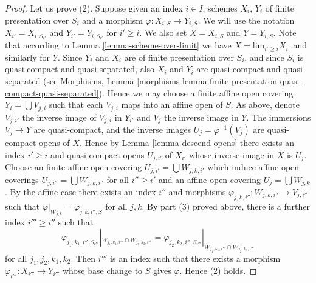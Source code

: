 \begin{proof}
\medskip\noindent
Let us prove (2). Suppose given an index $i \in I$, schemes
$X_i$, $Y_i$ of finite presentation over $S_i$ and a morphism
$\varphi : X_{i,S} \to Y_{i, S}$. We will use the notation
$X_{i'} = X_{i, S_{i'}}$ and $Y_{i'} = Y_{i, S_{i'}}$ for
$i' \geq i$. We also set $X = X_{i, S}$ and $Y = Y_{i, S}$.
Note that according to Lemma \ref{lemma-scheme-over-limit} we have
$X = \text{lim}_{i' \geq i} X_{i'}$ and similarly for $Y$.
Since $Y_i$ and $X_i$ are of finite presentation
over $S_i$, and since $S_i$ is quasi-compact and quasi-separated, also
$X_i$ and $Y_i$ are quasi-compact and quasi-separated
(see Morphisms,
Lemma \ref{morphisms-lemma-finite-presentation-quasi-compact-quasi-separated}).
Hence we may choose a finite affine open covering
$Y_i = \bigcup V_{j, i}$ such that each $V_{j, i}$ maps into
an affine open of $S$. As above, denote $V_{j, i'}$ the inverse
image of $V_{j, i}$ in $Y_{i'}$ and $V_j$ the inverse image in $Y$.
The immersions $V_j \to Y$ are quasi-compact, and the inverse images
$U_j = \varphi^{-1}(V_j)$ are quasi-compact opens of $X$.
Hence by Lemma \ref{lemma-descend-opens} there exists an index
$i' \geq i$ and quasi-compact opens $U_{j, i'}$ of $X_{i'}$
whose inverse image in $X$ is $U_j$. Choose an finite affine open covering
$U_{j, i'} = \bigcup W_{j, k, i'}$ which induce affine open
coverings $U_{j, i''} = \bigcup W_{j, k, i''}$
for all $i'' \geq i'$ and an affine open covering
$U_j = \bigcup W_{j, k}$. By the affine case there exists 
an index $i''$ and morphisms
$\varphi_{j, k, i''} : W_{j, k, i''} \to V_{j, i''}$
such that
$\varphi|_{W_{j, k}} = \varphi_{j, k, i'', S}$ for all $j, k$.
By part (3) proved above, there is a further index $i''' \geq i''$
such that
$$
\varphi_{j_1, k_1, i'', S_{i'''}}|_{W_{j_1, k_1, i'''} \cap W_{j_2, k_2, i'''}}
=
\varphi_{j_2, k_2, i'', S_{i'''}}|_{W_{j_1, k_1, i'''} \cap W_{j_2, k_2, i'''}}
$$
for all $j_1, j_2, k_1, k_2$. Then $i'''$ is an index such that
there exists a morphism $\varphi_{i'''} : X_{i'''} \to Y_{i'''}$ 
whose base change to $S$ gives $\varphi$. Hence (2) holds.


\end{proof}
